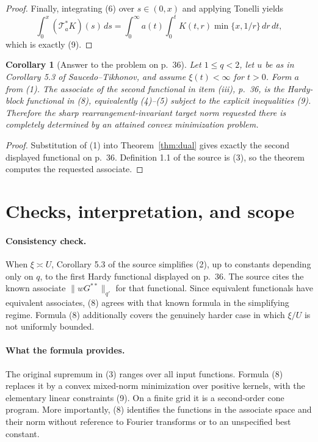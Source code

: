 \documentclass[11pt]{article}
\newtheorem{corollary}[theorem]{Corollary}
\newcommand{\T}{\mathcal T}
\begin{document}
\begin{proof}
Finally, integrating (6) over $s\in(0,x)$ and applying Tonelli yields
\[
 \int_0^x(\T_a^*K)(s)\,ds
 =\int_0^\infty a(t)\int_0^tK(t,r)\min\{x,1/r\}\,dr\,dt,
\]
which is exactly (9).
\end{proof}

\begin{corollary}[Answer to the problem on p.~36]\label{cor:source}
Let $1\le q<2$, let $u$ be as in Corollary 5.3 of Saucedo--Tikhonov, and
assume $\xi(t)<\infty$ for $t>0$.  Form $a$ from (1).  The associate of the
second functional in item (iii), p.~36, is the Hardy-block functional in
(8), equivalently (4)--(5) subject to the explicit inequalities (9).
Therefore the sharp rearrangement-invariant target norm requested there is
completely determined by an attained convex minimization problem.
\end{corollary}

\begin{proof}
Substitution of (1) into Theorem~\ref{thm:dual} gives exactly the second
displayed functional on p.~36.  Definition 1.1 of the source is (3), so the
theorem computes the requested associate.
\end{proof}

\section*{Checks, interpretation, and scope}

\paragraph{Consistency check.}
When $\xi\asymp U$, Corollary 5.3 of the source simplifies (2), up to constants
depending only on $q$, to the first Hardy functional displayed on p.~36.  The
source cites the known associate $\|wG^{**}\|_{q'}$ for that functional.
Since equivalent functionals have equivalent associates, (8) agrees with
that known formula in the simplifying regime.  Formula (8) additionally
covers the genuinely harder case in which $\xi/U$ is not uniformly bounded.

\paragraph{What the formula provides.}
The original supremum in (3) ranges over all input functions.  Formula (8)
replaces it by a convex mixed-norm minimization over positive kernels, with
the elementary linear constraints (9).  On a finite grid it is a
second-order cone program.  More importantly, (8) identifies the functions
in the associate space and their norm without reference to Fourier
transforms or to an unspecified best constant.
\end{document}
